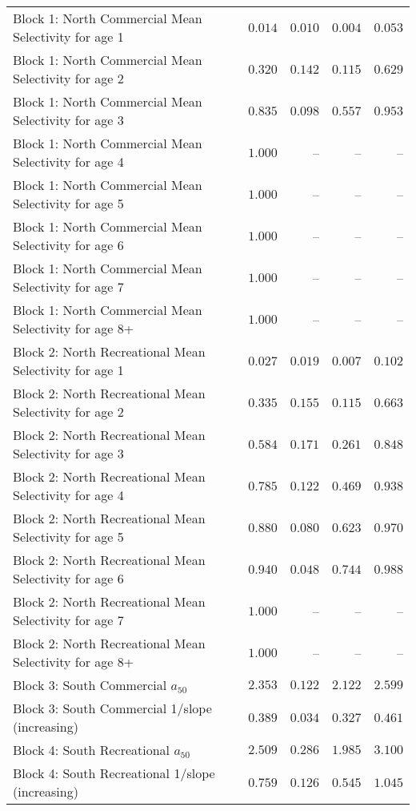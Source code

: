 \documentclass[
]{article}
\begin{document}
\begin{landscape}
\begin{longtable}[t]{lrrrr}
Block 1: North Commercial Mean Selectivity for age 1 & $0.014$ & $0.010$ & $0.004$ & $0.053$\\
Block 1: North Commercial Mean Selectivity for age 2 & $0.320$ & $0.142$ & $0.115$ & $0.629$\\
Block 1: North Commercial Mean Selectivity for age 3 & $0.835$ & $0.098$ & $0.557$ & $0.953$\\
Block 1: North Commercial Mean Selectivity for age 4 & $1.000$ & -- & -- & --\\
\addlinespace
Block 1: North Commercial Mean Selectivity for age 5 & $1.000$ & -- & -- & --\\
Block 1: North Commercial Mean Selectivity for age 6 & $1.000$ & -- & -- & --\\
Block 1: North Commercial Mean Selectivity for age 7 & $1.000$ & -- & -- & --\\
Block 1: North Commercial Mean Selectivity for age 8+ & $1.000$ & -- & -- & --\\
Block 2: North Recreational Mean Selectivity for age 1 & $0.027$ & $0.019$ & $0.007$ & $0.102$\\
\addlinespace
Block 2: North Recreational Mean Selectivity for age 2 & $0.335$ & $0.155$ & $0.115$ & $0.663$\\
Block 2: North Recreational Mean Selectivity for age 3 & $0.584$ & $0.171$ & $0.261$ & $0.848$\\
Block 2: North Recreational Mean Selectivity for age 4 & $0.785$ & $0.122$ & $0.469$ & $0.938$\\
Block 2: North Recreational Mean Selectivity for age 5 & $0.880$ & $0.080$ & $0.623$ & $0.970$\\
Block 2: North Recreational Mean Selectivity for age 6 & $0.940$ & $0.048$ & $0.744$ & $0.988$\\
\addlinespace
Block 2: North Recreational Mean Selectivity for age 7 & $1.000$ & -- & -- & --\\
Block 2: North Recreational Mean Selectivity for age 8+ & $1.000$ & -- & -- & --\\
Block 3: South Commercial $a_{50}$ & $2.353$ & $0.122$ & $2.122$ & $2.599$\\
Block 3: South Commercial 1/slope (increasing) & $0.389$ & $0.034$ & $0.327$ & $0.461$\\
Block 4: South Recreational $a_{50}$ & $2.509$ & $0.286$ & $1.985$ & $3.100$\\
\addlinespace
Block 4: South Recreational 1/slope (increasing) & $0.759$ & $0.126$ & $0.545$ & $1.045$\\

\end{longtable}
\end{landscape}
\end{document}

